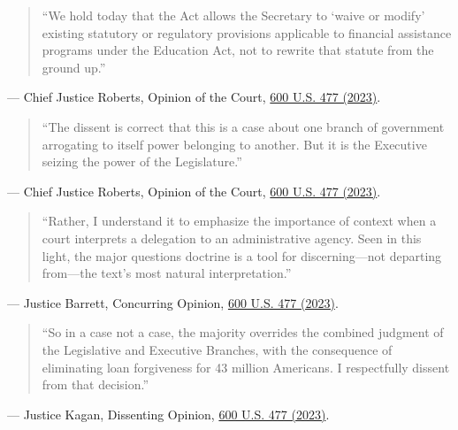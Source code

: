 \documentclass[12pt]{article}
\begin{document}
\begin{quote}
``We hold today that the Act allows the Secretary to `waive or modify' existing statutory or regulatory provisions applicable to financial assistance programs under the Education Act, not to rewrite that statute from the ground up.''
\end{quote}
\noindent --- Chief Justice Roberts, Opinion of the Court, \href{https://www.law.cornell.edu/supremecourt/text/22-506}{600 U.S. 477 (2023)}.

\begin{quote}
``The dissent is correct that this is a case about one branch of government arrogating to itself power belonging to another. But it is the Executive seizing the power of the Legislature.''
\end{quote}
\noindent --- Chief Justice Roberts, Opinion of the Court, \href{https://www.law.cornell.edu/supremecourt/text/22-506}{600 U.S. 477 (2023)}.

\begin{quote}
``Rather, I understand it to emphasize the importance of context when a court interprets a delegation to an administrative agency. Seen in this light, the major questions doctrine is a tool for discerning---not departing from---the text's most natural interpretation.''
\end{quote}
\noindent --- Justice Barrett, Concurring Opinion, \href{https://www.law.cornell.edu/supremecourt/text/22-506}{600 U.S. 477 (2023)}.

\begin{quote}
``So in a case not a case, the majority overrides the combined judgment of the Legislative and Executive Branches, with the consequence of eliminating loan forgiveness for 43 million Americans. I respectfully dissent from that decision.''
\end{quote}
\noindent --- Justice Kagan, Dissenting Opinion, \href{https://www.law.cornell.edu/supremecourt/text/22-506}{600 U.S. 477 (2023)}.
\end{document}
